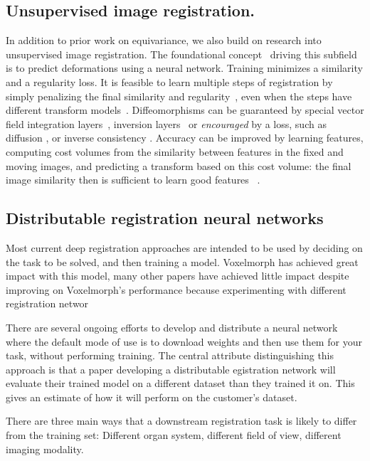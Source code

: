 \documentclass{article}
\begin{document}
\subsection{Unsupervised image registration.}
In addition to prior work on equivariance, we also build on research into unsupervised image registration. The foundational concept~\cite{balakrishnan2019voxelmorph} driving this subfield is to predict deformations using a neural network. Training minimizes a similarity and a regularity loss. It is feasible to learn multiple steps of registration by simply penalizing the final similarity and regularity~\cite{shen2019networks, greer2021icon, tian2022}, even when the steps have different transform models~\cite{greer2023inverse, shen2019networks}. Diffeomorphisms can be guaranteed by special vector field integration layers~\cite{dalca2018unsupervised}, inversion layers~\cite{asymreg} or \emph{encouraged} by a loss, such as diffusion \cite{balakrishnan2019voxelmorph, shen2019networks}, or inverse consistency \cite{greer2021icon, tian2022}. Accuracy can be improved by learning features, computing cost volumes from the similarity between features in the fixed and moving images, and predicting a transform based on this cost volume: the final image similarity then is sufficient to learn good features~
\cite{mok2020large}.

\subsection{Distributable registration neural networks}

Most current deep registration approaches are intended to be used by deciding on the task to be solved, and then training a model. Voxelmorph \cite{balakrishnan2019voxelmorph} has achieved great impact with this model, many other papers have achieved little impact despite improving on Voxelmorph's performance because experimenting with different registration networ

There are several ongoing efforts to develop and distribute a neural network where the default mode of use is to download weights and then use them for your task, without performing training. The central attribute distinguishing this approach is that a paper 
developing a distributable egistration network will evaluate their trained model on a different dataset than they trained it on. This gives an estimate of how it will perform on the customer's dataset.

There are three main ways that a downstream registration task is likely to differ from the training set: Different organ system, different field of view, different imaging modality.
\end{document}
